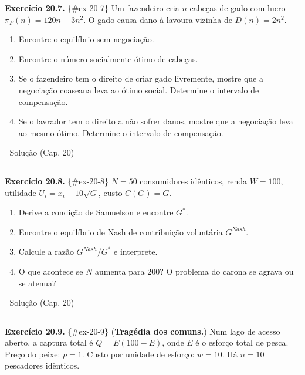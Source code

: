 \documentclass[11pt,twoside,openright]{book}
\providecommand{\tightlist}{\setlength{\itemsep}{0pt}\setlength{\parskip}{0pt}}
\begin{document}
\textbf{Exercício 20.7.} \{\#ex-20-7\} Um fazendeiro cria \(n\) cabeças
de gado com lucro \(\pi_F(n) = 120n - 3n^2\). O gado causa dano à
lavoura vizinha de \(D(n) = 2n^2\).

\begin{enumerate}
\def\labelenumi{(\alph{enumi})}
\tightlist
\item
  Encontre o equilíbrio sem negociação.
\item
  Encontre o número socialmente ótimo de cabeças.
\item
  Se o fazendeiro tem o direito de criar gado livremente, mostre que a
  negociação coaseana leva ao ótimo social. Determine o intervalo de
  compensação.
\item
  Se o lavrador tem o direito a não sofrer danos, mostre que a
  negociação leva ao mesmo ótimo. Determine o intervalo de compensação.
\end{enumerate}

🔑 Solução (Cap. 20)

\begin{center}\rule{0.5\linewidth}{0.5pt}\end{center}

\textbf{Exercício 20.8.} \{\#ex-20-8\} \(N = 50\) consumidores
idênticos, renda \(W = 100\), utilidade \(U_i = x_i + 10\sqrt{G}\),
custo \(C(G) = G\).

\begin{enumerate}
\def\labelenumi{(\alph{enumi})}
\tightlist
\item
  Derive a condição de Samuelson e encontre \(G^*\).
\item
  Encontre o equilíbrio de Nash de contribuição voluntária \(G^{Nash}\).
\item
  Calcule a razão \(G^{Nash}/G^*\) e interprete.
\item
  O que acontece se \(N\) aumenta para 200? O problema do carona se
  agrava ou se atenua?
\end{enumerate}

🔑 Solução (Cap. 20)

\begin{center}\rule{0.5\linewidth}{0.5pt}\end{center}

\textbf{Exercício 20.9.} \{\#ex-20-9\} (\textbf{Tragédia dos comuns.})
Num lago de acesso aberto, a captura total é \(Q = E(100 - E)\), onde
\(E\) é o esforço total de pesca. Preço do peixe: \(p = 1\). Custo por
unidade de esforço: \(w = 10\). Há \(n = 10\) pescadores idênticos.
\end{document}
